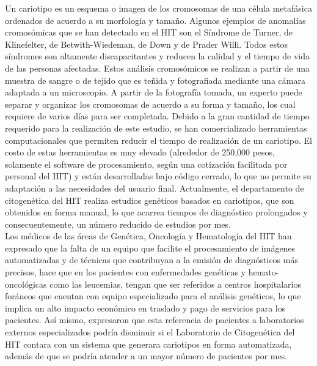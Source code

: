 \documentclass[12pt,letterpaper,titlepage]{article}
\begin{document}
Un cariotipo es un esquema o imagen de los cromosomas de una célula metafásica ordenados de acuerdo a su morfología y tamaño. Algunos ejemplos de anomalías cromosómicas que se han detectado en el HIT son el Síndrome de Turner, de Klinefelter, de Betwith-Wiedeman, de Down y de Prader Willi. Todos estos síndromes son altamente discapacitantes y reducen la calidad y el tiempo de vida de las personas afectadas. Estos análisis cromosómicos se realizan a partir de una muestra de sangre o de tejido que es teñida y fotografiada mediante una cámara adaptada a un microscopio. A partir de la fotografía tomada, un experto puede separar y organizar los cromosomas de acuerdo a su forma y tamaño, los cual requiere de varios días para ser completada. Debido a la gran cantidad de tiempo requerido para la realización de este estudio, se han comercializado herramientas computacionales que permiten reducir el tiempo de realización de un cariotipo. El costo de estas herramientas es muy elevado (alrededor de 250,000 pesos, solamente el software de procesamiento, según una cotización facilitada por personal del HIT) y están desarrolladas bajo código cerrado, lo que no permite su adaptación a las necesidades del usuario final. Actualmente, el departamento de citogenética del HIT realiza estudios genéticos basados en cariotipos, que son obtenidos en forma manual, lo que acarrea tiempos de diagnóstico prolongados y consecuentemente, un número reducido de estudios por mes. \\
Los médicos de las áreas de Genética, Oncología y Hematología del HIT han expresado que la falta de un equipo que facilite el procesamiento de imágenes automatizadas y de técnicas que contribuyan a la emisión de diagnósticos más precisos, hace que en los pacientes con enfermedades genéticas y hemato-oncológicas como las leucemias, tengan que ser referidos a centros hospitalarios foráneos que cuentan con equipo especializado para el análisis genéticos, lo que implica un alto impacto económico en traslado y pago de servicios para los pacientes. Así mismo, expresaron que esta referencia de pacientes a laboratorios externos especializados podría disminuir si el Laboratorio de Citogenética del HIT contara con un sistema que generara cariotipos en forma automatizada, además de que se podría atender a un mayor número de pacientes por mes. \\
\end{document}
